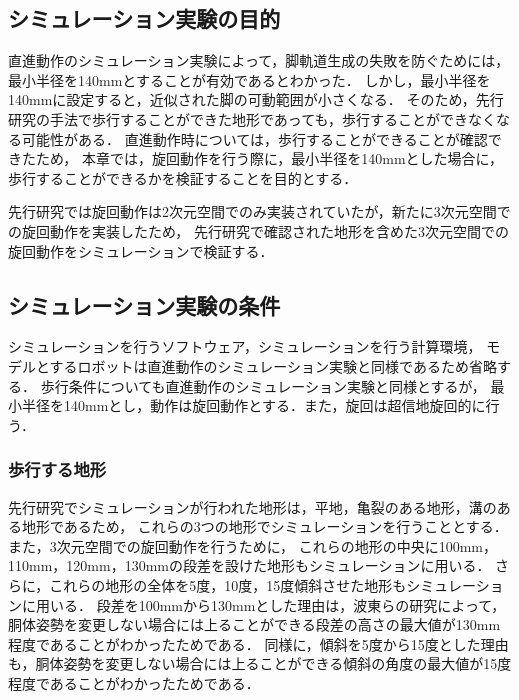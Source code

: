 
\subsection{シミュレーション実験の目的}
直進動作のシミュレーション実験によって，脚軌道生成の失敗を防ぐためには，最小半径を140mmとすることが有効であるとわかった．
しかし，最小半径を140mmに設定すると，近似された脚の可動範囲が小さくなる．
そのため，先行研究の手法で歩行することができた地形であっても，歩行することができなくなる可能性がある．
直進動作時については，歩行することができることが確認できたため，
本章では，旋回動作を行う際に，最小半径を140mmとした場合に，歩行することができるかを検証することを目的とする．

先行研究では旋回動作は2次元空間でのみ実装されていたが，新たに3次元空間での旋回動作を実装したため，
先行研究で確認された地形を含めた3次元空間での旋回動作をシミュレーションで検証する．

\subsection{シミュレーション実験の条件}
シミュレーションを行うソフトウェア，シミュレーションを行う計算環境，
モデルとするロボットは直進動作のシミュレーション実験と同様であるため省略する．
歩行条件についても直進動作のシミュレーション実験と同様とするが，
最小半径を140mmとし，動作は旋回動作とする．また，旋回は超信地旋回的に行う．

\subsubsection{歩行する地形}
先行研究でシミュレーションが行われた地形は，平地，亀裂のある地形，溝のある地形であるため，
これらの3つの地形でシミュレーションを行うこととする．
また，3次元空間での旋回動作を行うために，
これらの地形の中央に100mm，110mm，120mm，130mmの段差を設けた地形もシミュレーションに用いる．
さらに，これらの地形の全体を5度，10度，15度傾斜させた地形もシミュレーションに用いる．
段差を100mmから130mmとした理由は，波東らの研究によって，胴体姿勢を変更しない場合には上ることができる段差の高さの最大値が130mm程度であることがわかったためである．
同様に，傾斜を5度から15度とした理由も，胴体姿勢を変更しない場合には上ることができる傾斜の角度の最大値が15度程度であることがわかったためである．

